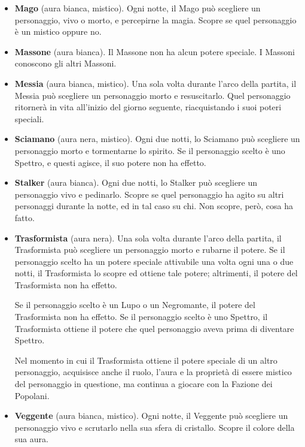 \documentclass[a4paper,10pt]{article}
\begin{document}
\begin{itemize}
 \item {\bf Mago} (aura bianca, mistico). Ogni notte, il Mago può scegliere un personaggio, vivo o morto, e percepirne la magia. Scopre se quel personaggio è un mistico oppure no.
 
 \item {\bf Massone} (aura bianca). Il Massone non ha alcun potere speciale. I Massoni conoscono gli altri Massoni.
 
 \item {\bf Messia} (aura bianca, mistico). Una sola volta durante l'arco della partita, il Messia può scegliere un personaggio morto e resuscitarlo. Quel personaggio ritornerà in vita all'inizio del giorno seguente, riacquistando i suoi poteri speciali.

 \item{\bf Sciamano} (aura nera, mistico). Ogni due notti, lo Sciamano può scegliere un personaggio morto e tormentarne lo spirito. Se il personaggio scelto è uno Spettro, e questi agisce, il suo potere non ha effetto.

 \item {\bf Stalker} (aura bianca). Ogni due notti, lo Stalker può scegliere un personaggio vivo e pedinarlo. Scopre se quel personaggio ha agito su altri personaggi durante la notte, ed in tal caso su chi. Non scopre, però, cosa ha fatto.
 

 \item {\bf Trasformista} (aura nera). Una sola volta durante l'arco della partita, il Trasformista può scegliere un personaggio morto e rubarne il potere. Se il personaggio scelto ha un potere speciale attivabile una volta ogni una o due notti, il Trasformista lo scopre ed ottiene tale potere; altrimenti, il potere del Trasformista non ha effetto.
 
 Se il personaggio scelto è un Lupo o un Negromante, il potere del Trasformista non ha effetto. Se il personaggio scelto è uno Spettro, il Trasformista ottiene il potere che quel personaggio aveva prima di diventare Spettro.
 
 Nel momento in cui il Trasformista ottiene il potere speciale di un altro personaggio, acquisisce anche il ruolo, l'aura e la proprietà di essere mistico del personaggio in questione, ma continua a giocare con la Fazione dei Popolani.

 \item {\bf Veggente} (aura bianca, mistico). Ogni notte, il Veggente può scegliere un personaggio vivo e scrutarlo nella sua sfera di cristallo. Scopre il colore della sua aura.


\end{itemize}
\end{document}
